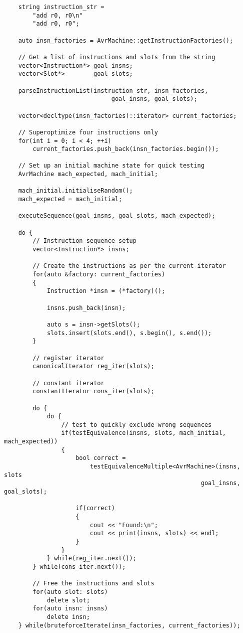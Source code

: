 \documentclass{article}
\begin{document}
\begin{verbatim}
    string instruction_str =
        "add r0, r0\n"
        "add r0, r0";

    auto insn_factories = AvrMachine::getInstructionFactories();

    // Get a list of instructions and slots from the string
    vector<Instruction*> goal_insns;
    vector<Slot*>        goal_slots;

    parseInstructionList(instruction_str, insn_factories,
                              goal_insns, goal_slots);

    vector<decltype(insn_factories)::iterator> current_factories;

    // Superoptimize four instructions only
    for(int i = 0; i < 4; ++i)
        current_factories.push_back(insn_factories.begin());

    // Set up an initial machine state for quick testing
    AvrMachine mach_expected, mach_initial;

    mach_initial.initialiseRandom();
    mach_expected = mach_initial;

    executeSequence(goal_insns, goal_slots, mach_expected);

    do {
        // Instruction sequence setup
        vector<Instruction*> insns;

        // Create the instructions as per the current iterator
        for(auto &factory: current_factories)
        {
            Instruction *insn = (*factory)();

            insns.push_back(insn);

            auto s = insn->getSlots();
            slots.insert(slots.end(), s.begin(), s.end());
        }

        // register iterator
        canonicalIterator reg_iter(slots);

        // constant iterator
        constantIterator cons_iter(slots);

        do {
            do {
                // test to quickly exclude wrong sequences
                if(testEquivalence(insns, slots, mach_initial, mach_expected))
                {
                    bool correct =
                        testEquivalenceMultiple<AvrMachine>(insns, slots
                                                       goal_insns, goal_slots);

                    if(correct)
                    {
                        cout << "Found:\n";
                        cout << print(insns, slots) << endl;
                    }
                }
            } while(reg_iter.next());
        } while(cons_iter.next());

        // Free the instructions and slots
        for(auto slot: slots)
            delete slot;
        for(auto insn: insns)
            delete insn;
    } while(bruteforceIterate(insn_factories, current_factories));

\end{verbatim}
\end{document}
